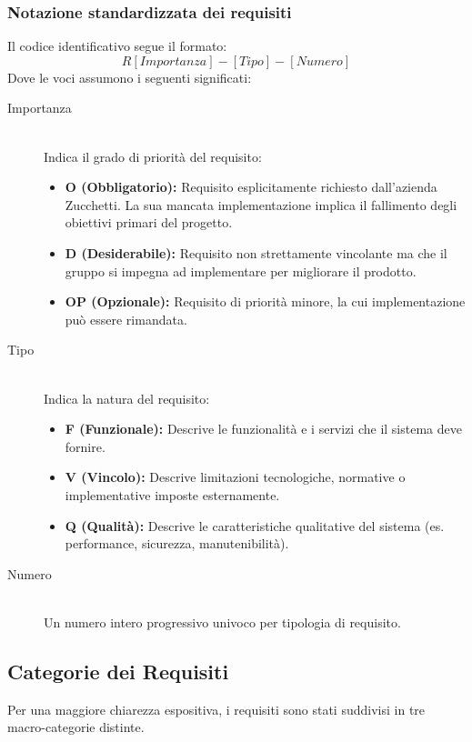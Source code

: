 \documentclass[11pt,a4paper]{article}
\begin{document}
\subsubsection{Notazione standardizzata dei requisiti}
Il codice identificativo segue il formato:
\[
R[Importanza]-[Tipo]-[Numero]
\]
Dove le voci assumono i seguenti significati:

\begin{description}
    \item[Importanza] \hfill \\
    Indica il grado di priorità del requisito:
    \begin{itemize}
        \item \textbf{O (Obbligatorio):} Requisito esplicitamente richiesto dall'azienda Zucchetti. La sua mancata implementazione implica il fallimento degli obiettivi primari del progetto.
        \item \textbf{D (Desiderabile):} Requisito non strettamente vincolante ma che il gruppo si impegna ad implementare per migliorare il prodotto.
        \item \textbf{OP (Opzionale):} Requisito di priorità minore, la cui implementazione può essere rimandata.
    \end{itemize}
    
    \item[Tipo] \hfill \\
    Indica la natura del requisito:
    \begin{itemize}
        \item \textbf{F (Funzionale):} Descrive le funzionalità e i servizi che il sistema deve fornire.
        \item \textbf{V (Vincolo):} Descrive limitazioni tecnologiche, normative o implementative imposte esternamente.
        \item \textbf{Q (Qualità):} Descrive le caratteristiche qualitative del sistema (es. performance, sicurezza, manutenibilità).
    \end{itemize}
    
    \item[Numero] \hfill \\
    Un numero intero progressivo univoco per tipologia di requisito.
\end{description}

\subsection{Categorie dei Requisiti}
Per una maggiore chiarezza espositiva, i requisiti sono stati suddivisi in tre macro-categorie distinte.
\end{document}
